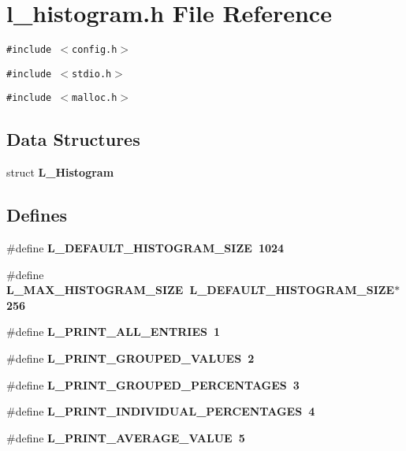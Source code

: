 \section{l\_\-histogram.h File Reference}
\label{l__histogram_8h}
{\tt \#include $<$config.h$>$}\par
{\tt \#include $<$stdio.h$>$}\par
{\tt \#include $<$malloc.h$>$}\par
\subsection*{Data Structures}
\begin{CompactItemize}
\item 
struct \bf{L\_\-Histogram}
\end{CompactItemize}
\subsection*{Defines}
\begin{CompactItemize}
\item 
\#define \bf{L\_\-DEFAULT\_\-HISTOGRAM\_\-SIZE}~1024
\item 
\#define \bf{L\_\-MAX\_\-HISTOGRAM\_\-SIZE}~L\_\-DEFAULT\_\-HISTOGRAM\_\-SIZE$\ast$256
\item 
\#define \bf{L\_\-PRINT\_\-ALL\_\-ENTRIES}~1
\item 
\#define \bf{L\_\-PRINT\_\-GROUPED\_\-VALUES}~2
\item 
\#define \bf{L\_\-PRINT\_\-GROUPED\_\-PERCENTAGES}~3
\item 
\#define \bf{L\_\-PRINT\_\-INDIVIDUAL\_\-PERCENTAGES}~4
\item 
\#define \bf{L\_\-PRINT\_\-AVERAGE\_\-VALUE}~5
\end{CompactItemize}
